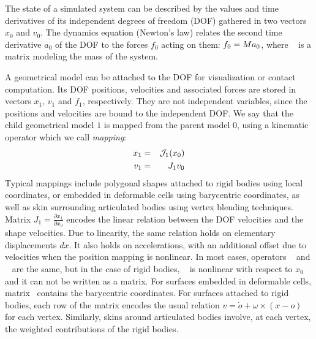 The state of a simulated system can be described by the values and time derivatives of its independent degrees of freedom (DOF) gathered in two vectors $x_0$ and $v_0$.
The dynamics equation (Newton's law) relates the second time derivative $a_0$ of the DOF to the forces $f_0$ acting on them: $f_0 = M a_0$, where \mass~ is a matrix modeling the mass of the system.

A geometrical model can be attached to the DOF for visualization or contact computation. 
Its DOF positions, velocities and associated forces are stored in vectors $x_1$, $v_1$ and $f_1$, respectively.
They are not independent variables, since the positions and velocities are bound to the independent DOF.
We say that the child geometrical model $1$ is mapped from the parent model $0$,
 using a kinematic operator which we call \textit{mapping}:
\begin{eqnarray*} %
x_1 &=&\JNL_1(x_0)\\ 
v_1 &=& J_1 v_0
\end{eqnarray*}
Typical mappings include polygonal shapes attached to rigid bodies using local coordinates, or embedded in deformable cells using barycentric coordinates, as well as skin surrounding articulated bodies using vertex blending techniques.
Matrix $J_1 = \frac{\partial x_1}{\partial x_0}$ encodes the linear relation between the DOF velocities and the shape velocities. Due to linearity, the same relation holds on elementary displacements $dx$.
It also holds on accelerations, with an additional offset due to velocities when the position mapping \JNL is nonlinear.
In most cases, operators \JNL~ and \J~ are the same, but in the case of rigid bodies, \JNL~ is nonlinear with respect to $x_0$ and it can not be written as a matrix.
For surfaces embedded in deformable cells, matrix \J~contains the barycentric coordinates. 
For surfaces attached to rigid bodies, each row of the matrix encodes the usual relation $v = \dot o + \omega \times (x-o)$ for each vertex. 
Similarly, skins around articulated bodies involve, at each vertex, the weighted  contributions of the rigid bodies. 


